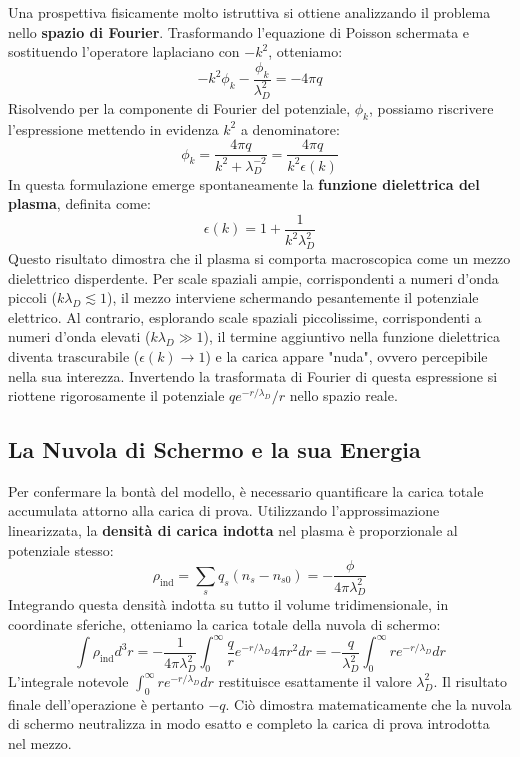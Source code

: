 Una prospettiva fisicamente molto istruttiva si ottiene analizzando il problema nello \textbf{spazio di Fourier}. Trasformando l'equazione di Poisson schermata e sostituendo l'operatore laplaciano con $-k^2$, otteniamo:
\begin{equation}
-k^2 \phi_k - \frac{\phi_k}{\lambda_D^2} = -4\pi q
\end{equation}
Risolvendo per la componente di Fourier del potenziale, $\phi_k$, possiamo riscrivere l'espressione mettendo in evidenza $k^2$ a denominatore:
\begin{equation}
\phi_k = \frac{4\pi q}{k^2 + \lambda_D^{-2}} = \frac{4\pi q}{k^2 \epsilon(k)}
\end{equation}
In questa formulazione emerge spontaneamente la \textbf{funzione dielettrica del plasma}, definita come:
\begin{equation}
\epsilon(k) = 1 + \frac{1}{k^2\lambda_D^2}
\end{equation}
Questo risultato dimostra che il plasma si comporta macroscopica come un mezzo dielettrico disperdente. Per scale spaziali ampie, corrispondenti a numeri d'onda piccoli ($k\lambda_D \lesssim 1$), il mezzo interviene schermando pesantemente il potenziale elettrico. Al contrario, esplorando scale spaziali piccolissime, corrispondenti a numeri d'onda elevati ($k\lambda_D \gg 1$), il termine aggiuntivo nella funzione dielettrica diventa trascurabile ($\epsilon(k) \to 1$) e la carica appare "nuda", ovvero percepibile nella sua interezza. Invertendo la trasformata di Fourier di questa espressione si riottene rigorosamente il potenziale $q e^{-r/\lambda_D}/r$ nello spazio reale.

\subsection{La Nuvola di Schermo e la sua Energia}

Per confermare la bontà del modello, è necessario quantificare la carica totale accumulata attorno alla carica di prova. Utilizzando l'approssimazione linearizzata, la \textbf{densità di carica indotta} nel plasma è proporzionale al potenziale stesso:
\begin{equation}
\rho_{\text{ind}} = \sum_s q_s(n_s - n_{s0}) = -\frac{\phi}{4\pi\lambda_D^2}
\end{equation}
Integrando questa densità indotta su tutto il volume tridimensionale, in coordinate sferiche, otteniamo la carica totale della nuvola di schermo:
\begin{equation}
\int \rho_{\text{ind}} d^3r = -\frac{1}{4\pi\lambda_D^2} \int_0^\infty \frac{q}{r} e^{-r/\lambda_D} 4\pi r^2 dr = -\frac{q}{\lambda_D^2} \int_0^\infty r e^{-r/\lambda_D} dr
\end{equation}
L'integrale notevole $\int_0^\infty r e^{-r/\lambda_D} dr$ restituisce esattamente il valore $\lambda_D^2$. Il risultato finale dell'operazione è pertanto \textbf{$-q$}. Ciò dimostra matematicamente che la nuvola di schermo neutralizza in modo esatto e completo la carica di prova introdotta nel mezzo.


